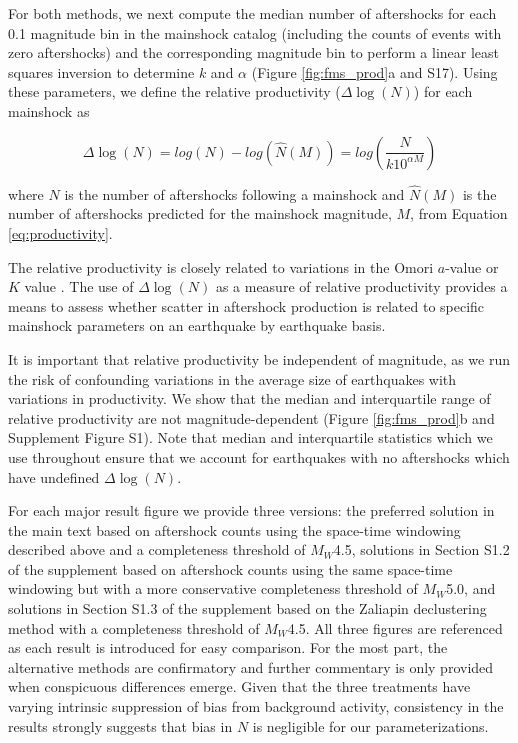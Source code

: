 \documentclass[draft, jgrga]{agujournal2018}
\begin{document}
For both methods, we next compute the median number of aftershocks for each 0.1 magnitude bin in the mainshock catalog (including the counts of events with zero aftershocks) and the corresponding magnitude bin to perform a linear least squares inversion to determine $k$ and $\alpha$ (Figure \ref{fig:fms_prod}a and S17). Using these parameters, we define the relative productivity ($\Delta \log(N)$) for each mainshock as
%
\begin{linenomath*}
\begin{equation}
    \Delta \log(N) = log(N) - log(\hat{N}(M)) = log\left(\dfrac{N}{k10^{\alpha M}}\right)
    \label{eq:residual_productivity}
\end{equation}
\end{linenomath*}
%
where $N$ is the number of aftershocks following a mainshock and $\hat{N}(M)$ is the number of aftershocks predicted for the mainshock magnitude, $M$, from Equation \ref{eq:productivity}.

The relative productivity is closely related to variations in the Omori $a$-value or $K$ value \citep[e.g.][]{Page, Hardebeck2018UpdatedParameters, Utsu1995,Ogata1988}. The use of $\Delta \log(N)$ as a measure of relative productivity provides a means to assess whether scatter in aftershock production is related to specific mainshock parameters on an earthquake by earthquake basis.

It is important that relative productivity be independent of magnitude, as we run the risk of confounding variations in the average size of earthquakes with variations in productivity. We show that the median and interquartile range of relative productivity are not magnitude-dependent (Figure \ref{fig:fms_prod}b and Supplement Figure S1). Note that median and interquartile statistics which we use throughout ensure that we account for earthquakes with no aftershocks which have undefined $\Delta \log(N)$.

For each major result figure we provide three versions: the preferred solution in the main text based on aftershock counts using the space-time windowing described above and a completeness threshold of $M_W$4.5, solutions in Section S1.2 of the supplement based on aftershock counts using the same space-time windowing but with a more conservative completeness threshold of $M_W$5.0, and solutions in Section S1.3 of the supplement based on the Zaliapin declustering method with a completeness threshold of $M_W$4.5. All three figures are referenced as each result is introduced for easy comparison. For the most part, the alternative methods are confirmatory and further commentary is only provided when conspicuous differences emerge. Given that the three treatments have varying intrinsic suppression of bias from background activity, consistency in the results strongly suggests that bias in $N$ is negligible for our parameterizations.
\end{document}
